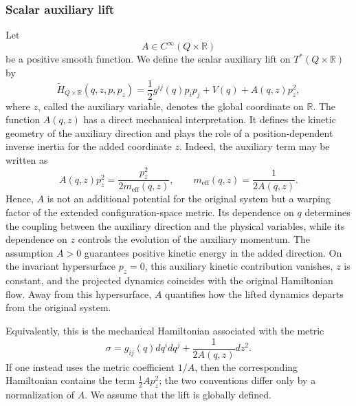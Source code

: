 \documentclass[10pt,a4paper]{article}
\begin{document}
\subsubsection{Scalar auxiliary lift}

Let
\[
A\in C^\infty(Q\times \mathbb R)
\]
be a positive smooth function. We define the scalar auxiliary lift on \(T^*(Q\times\mathbb R)\) by
\begin{equation*}
\label{eqlift2}
\widetilde H_{Q\times\mathbb R}(q,z,p,p_z)
=
\frac{1}{2}g^{ij}(q)p_i p_j
+
V(q)
+
A(q,z)p_z^2 ,
\end{equation*}
where \(z\), called the auxiliary variable, denotes the global coordinate on \(\mathbb R\). The function \(A(q,z)\) has a direct mechanical interpretation. It defines the kinetic geometry of the auxiliary direction and plays the role of a position-dependent inverse inertia for the added coordinate \(z\). Indeed, the auxiliary term may be written as
\[
A(q,z)p_z^2=\frac{p_z^2}{2m_{\mathrm{eff}}(q,z)},
\qquad
m_{\mathrm{eff}}(q,z)=\frac{1}{2A(q,z)}.
\]
Hence, \(A\) is not an additional potential for the original system but a warping factor of the extended configuration-space metric. Its dependence on \(q\) determines the coupling between the auxiliary direction and the physical variables, while its dependence on \(z\) controls the evolution of the auxiliary momentum. The assumption \(A>0\) guarantees positive kinetic energy in the added direction. On the invariant hypersurface \(p_z=0\), this auxiliary kinetic contribution vanishes, \(z\) is constant, and the projected dynamics coincides with the original Hamiltonian flow. Away from this hypersurface, \(A\) quantifies how the lifted dynamics departs from the original system.

Equivalently, this is the mechanical Hamiltonian associated with the metric
\[
\sigma
=
g_{ij}(q)dq^i dq^j+\frac{1}{2A(q,z)}dz^2.
\]
If one instead uses the metric coefficient \(1/A\), then the corresponding Hamiltonian contains the term \(\frac12 A p_z^2\); the two conventions differ only by a normalization of \(A\). We assume that the lift is globally defined.
\end{document}
